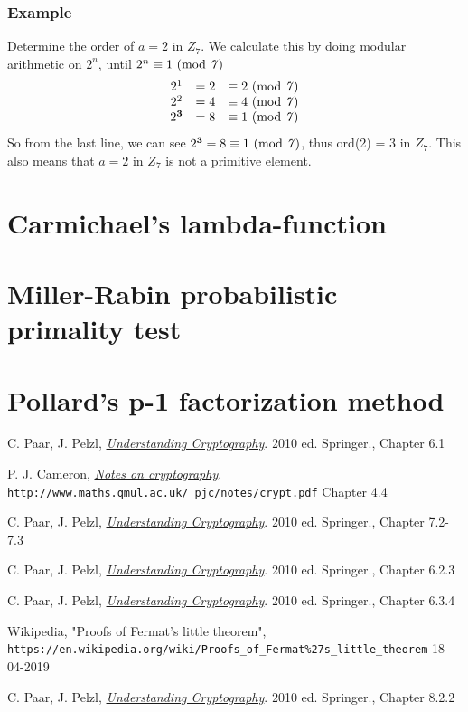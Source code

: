 \documentclass{article}
\begin{document}
	\subsubsection*{Example}
	Determine the order of $a = 2$ in $Z_7$. We calculate this by doing modular arithmetic on $2^n$, until $2^n \equiv 1 \text{ (mod \textit{7})}$
	\[
	\begin{matrix*}{}
		2^1&=2 &\equiv 2 \text{ (mod \textit{7})}\\
		2^2&=4 &\equiv 4 \text{ (mod \textit{7})}\\
		2^\textbf{3}&=8 &\equiv 1 \text{ (mod \textit{7})}\\
	\end{matrix*}
	\]
	So from the last line, we can see $2^\textbf{3}=8 \equiv 1 \text{ (mod \textit{7})}$, thus ord(2) = 3 in $Z_7$. This also means that $a = 2$ in $Z_7$ is not a primitive element.
	
	\section*{Carmichael's lambda-function} 
	
	\section*{Miller-Rabin probabilistic primality test}
	
	\section*{Pollard's p-1 factorization method}
	 

	\newpage

	\begin{thebibliography}{99}
		
		C. Paar, J. Pelzl, 
		\textit{\underline{Understanding Cryptography}}. 2010 ed.
		Springer., Chapter 6.1 
		
		P. J. Cameron, 
		\textit{\underline{Notes on cryptography}}.
		\\\texttt{http://www.maths.qmul.ac.uk/~pjc/notes/crypt.pdf}
		Chapter 4.4 
		
		C. Paar, J. Pelzl, 
		\textit{\underline{Understanding Cryptography}}. 2010 ed.
		Springer., Chapter 7.2-7.3 
		
		C. Paar, J. Pelzl, 
		\textit{\underline{Understanding Cryptography}}. 2010 ed.
		Springer., Chapter 6.2.3 
		
		C. Paar, J. Pelzl, 
		\textit{\underline{Understanding Cryptography}}. 2010 ed.
		Springer., Chapter 6.3.4 
		
		Wikipedia, "Proofs of Fermat's little theorem",
		\\\texttt{https://en.wikipedia.org/wiki/Proofs\_of\_Fermat\%27s\_little\_theorem} 18-04-2019
		
		C. Paar, J. Pelzl, 
		\textit{\underline{Understanding Cryptography}}. 2010 ed.
		Springer., Chapter 8.2.2 
		
	\end{thebibliography}
\end{document}
